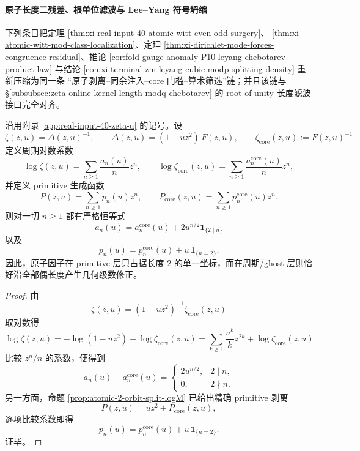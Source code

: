 \paragraph{原子长度二残差、根单位滤波与 Lee--Yang 符号坍缩}
下列条目把定理 \ref{thm:xi-real-input-40-atomic-witt-even-odd-surgery}、
\ref{thm:xi-atomic-witt-mod-class-localization}、定理
\ref{thm:xi-dirichlet-mode-forces-congruence-residual}、推论
\ref{cor:fold-gauge-anomaly-P10-leyang-chebotarev-product-law} 与结论
\ref{con:xi-terminal-zm-leyang-cubic-modp-splitting-density} 重新压缩为同一条
“原子剥离--同余注入--core 门槛--算术筛选”链；并且该链与
\S\ref{subsubsec:zeta-online-kernel-length-modq-chebotarev} 的 root-of-unity 长度滤波接口完全对齐。

\begin{theorem}\label{thm:xi-atomic-witt-cycle-primitive-exact-peeling}
沿用附录 \ref{app:real-input-40-zeta-u} 的记号。设
\[
\zeta(z,u)=\Delta(z,u)^{-1},
\qquad
\Delta(z,u)=(1-uz^2)\,F(z,u),
\qquad
\zeta_{\mathrm{core}}(z,u):=F(z,u)^{-1}.
\]
定义周期对数系数
\[
\log\zeta(z,u)=\sum_{n\ge 1}\frac{a_n(u)}{n}z^n,
\qquad
\log\zeta_{\mathrm{core}}(z,u)=\sum_{n\ge 1}\frac{a_n^{\mathrm{core}}(u)}{n}z^n,
\]
并定义 primitive 生成函数
\[
P(z,u)=\sum_{n\ge 1}p_n(u)z^n,
\qquad
P_{\mathrm{core}}(z,u)=\sum_{n\ge 1}p_n^{\mathrm{core}}(u)z^n.
\]
则对一切 \(n\ge 1\) 都有严格恒等式
\[
\boxed{\;
a_n(u)=a_n^{\mathrm{core}}(u)+2u^{n/2}\mathbf 1_{\{2\mid n\}}\;}
\]
以及
\[
\boxed{\;
p_n(u)=p_n^{\mathrm{core}}(u)+u\,\mathbf 1_{\{n=2\}}.\;}
\]
因此，原子因子在 primitive 层只占据长度 \(2\) 的单一坐标，而在周期/ghost 层则恰好沿全部偶长度产生几何级数修正。
\end{theorem}
\begin{proof}
由
\[
\zeta(z,u)=(1-uz^2)^{-1}\zeta_{\mathrm{core}}(z,u)
\]
取对数得
\[
\log\zeta(z,u)
=
-\log(1-uz^2)+\log\zeta_{\mathrm{core}}(z,u)
=
\sum_{k\ge 1}\frac{u^k}{k}z^{2k}
+\log\zeta_{\mathrm{core}}(z,u).
\]
比较 \(z^n/n\) 的系数，便得到
\[
a_n(u)-a_n^{\mathrm{core}}(u)=
\begin{cases}
2u^{n/2},&2\mid n,\\
0,&2\nmid n.
\end{cases}
\]
另一方面，命题 \ref{prop:atomic-2-orbit-split-logM} 已给出精确 primitive 剥离
\[
P(z,u)=uz^2+P_{\mathrm{core}}(z,u),
\]
逐项比较系数即得
\[
p_n(u)=p_n^{\mathrm{core}}(u)+u\,\mathbf 1_{\{n=2\}}.
\]
证毕。
\end{proof}

